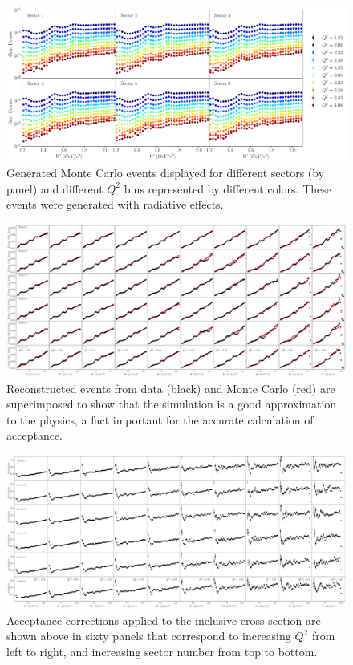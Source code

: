 \begin{figure}
	\centering
	\label{fig-gen-events} 
	\includegraphics[width=\textwidth]{image/plots/inclusive/gen_events_superimposed.pdf}
	\caption{Generated Monte Carlo events displayed for different sectors (by panel) and different $Q^2$ bins represented by different colors.  These events were generated with radiative effects.}
\end{figure}

\begin{figure}
	\centering
	\label{fig-data-rec-grid} 
	\includegraphics[width=\textwidth]{image/plots/inclusive/compare_data_rec_grid.pdf}
	\caption{Reconstructed events from data (black) and Monte Carlo (red) are superimposed to show that the simulation is a good approximation to the physics, a fact important for the accurate calculation of acceptance.}
\end{figure}

\begin{figure}
	\centering
	\label{fig-acceptance-grid} 
	\includegraphics[width=\textwidth]{image/plots/inclusive/acceptance_grid.pdf}
	\caption{Acceptance corrections applied to the inclusive cross section are shown above in sixty panels that correspond to increasing $Q^2$ from left to right, and increasing sector number from top to bottom.  }
\end{figure}

